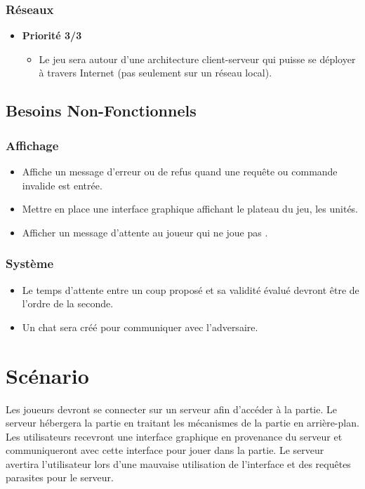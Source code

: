 \subsubsection{Réseaux}
\begin{itemize}
    \item \textbf{Priorité 3/3}
    \begin{itemize}
        \item Le jeu sera autour d'une architecture client-serveur qui puisse se déployer à travers Internet (pas seulement sur un réseau local).\cmark
    \end{itemize}
\end{itemize}

\subsection{Besoins Non-Fonctionnels}

\subsubsection{Affichage}
\begin{itemize}
    \item Affiche un message d'erreur ou de refus quand une requête ou commande invalide est entrée.\cmark
    \item Mettre en place une interface graphique affichant le plateau du jeu, les unités.\cmark
    \item Afficher un message d'attente au joueur  qui ne joue pas .\cmark
\end{itemize}

\subsubsection{Système}
\begin{itemize}
    \item Le temps d'attente entre un coup proposé et sa validité évalué devront être de l'ordre de la seconde.\cmark
    \item Un chat sera créé pour communiquer avec l'adversaire.\cmark
\end{itemize}

\section{Scénario}

Les joueurs devront se connecter sur un serveur afin d'accéder à la partie. Le serveur hébergera la partie en traitant les mécanismes de la partie en arrière-plan. Les utilisateurs recevront une interface graphique en provenance du serveur et communiqueront avec cette interface pour jouer dans la partie.
Le serveur avertira l'utilisateur lors d'une mauvaise utilisation de l'interface et des requêtes parasites pour le serveur.


